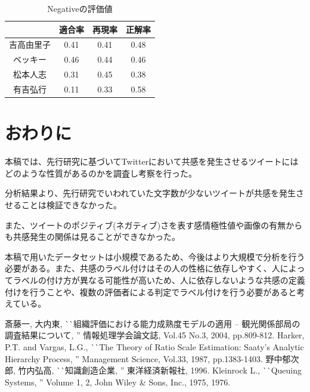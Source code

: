 \documentclass[dvipdfmx]{issj}
\begin{document}
\begin{table}[htb]
  \begin{center}
    \caption{Negativeの評価値}
    \begin{tabular}{c|ccc} \hline \hline
& 適合率 & 再現率 & 正解率 \\ \hline \hline
吉高由里子 &0.41&0.41&0.48 \\ \hline
ベッキー &0.46&0.44&0.46\\ \hline
松本人志 &0.31&0.45&0.38\\ \hline
有吉弘行 & 0.11&0.33&0.58 \\ \hline
    \end{tabular}
    \label{tab:tripcode_user}
  \end{center}
\end{table}



\section{おわりに}  %

本稿では、先行研究に基づいてTwitterにおいて共感を発生させるツイートにはどのような性質があるのかを調査し考察を行った。

分析結果より、先行研究でいわれていた文字数が少ないツイートが共感を発生させることは検証できなかった。

また、ツイートのポジティブ(ネガティブ)さを表す感情極性値や画像の有無からも共感発生の関係は見ることができなかった。

本稿で用いたデータセットは小規模であるため、今後はより大規模で分析を行う必要がある。また、共感のラベル付けはその人の性格に依存しやすく、人によってラベルの付け方が異なる可能性が高いため、人に依存しないような共感の定義付けを行うことや、複数の評価者による判定でラベル付けを行う必要があると考えている。





\begin{thebibliography}{99}


   斎藤一, 大内東, 
                       ^^ ^^ 組織評価における能力成熟度モデルの適用 -- 観光関係部局の調査結果について, '' 
                       情報処理学会論文誌, Vol.45 No.3, 2004, pp.809-812.
   Harker, P.T. and Vargas, L.G., 
                       ^^ ^^ The Theory of Ratio Scale Estimation: Saaty’s Analytic Hierarchy Process, '' 
                       Management Science, Vol.33, 1987, pp.1383-1403.
   野中郁次郎, 竹内弘高, ^^ ^^ 知識創造企業, '' 東洋経済新報社, 1996.
    Kleinrock L., 
                       ^^ ^^ Queuing Systems, '' Volume 1, 2, John Wiley \& Sons, Inc., 1975, 1976.
\end{thebibliography}
\end{document}
